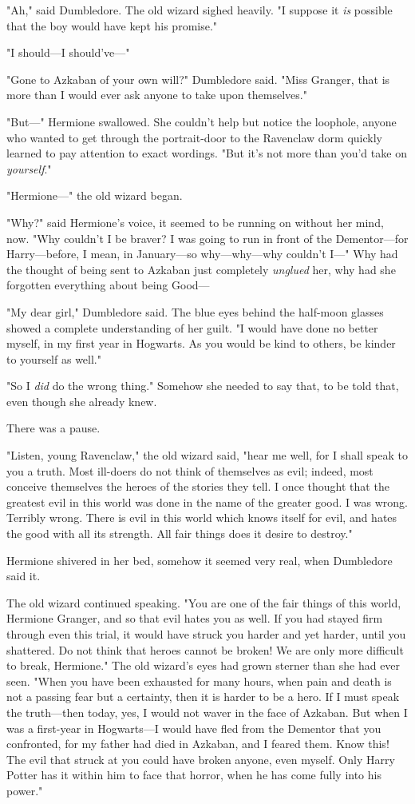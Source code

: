 "Ah," said Dumbledore. The old wizard sighed heavily. "I suppose it \emph{is}
possible that the boy would have kept his promise."

"I should---I should've---"

"Gone to Azkaban of your own will?" Dumbledore said. "Miss Granger, that is
more than I would ever ask anyone to take upon themselves."

"But---" Hermione swallowed. She couldn't help but notice the loophole, anyone
who wanted to get through the portrait-door to the Ravenclaw dorm quickly
learned to pay attention to exact wordings. "But it's not more than you'd take
on \emph{yourself}."

"Hermione---" the old wizard began.

"Why?" said Hermione's voice, it seemed to be running on without her mind, now.
"Why couldn't I be braver? I was going to run in front of the Dementor---for
Harry---before, I mean, in January---so why---why---why couldn't I---" Why had
the thought of being sent to Azkaban just completely \emph{unglued} her, why
had she forgotten everything about being Good---

"My dear girl," Dumbledore said. The blue eyes behind the half-moon glasses
showed a complete understanding of her guilt. "I would have done no better
myself, in my first year in Hogwarts. As you would be kind to others, be kinder
to yourself as well."

"So I \emph{did} do the wrong thing." Somehow she needed to say that, to be
told that, even though she already knew.

There was a pause.

"Listen, young Ravenclaw," the old wizard said, "hear me well, for I shall
speak to you a truth. Most ill-doers do not think of themselves as evil;
indeed, most conceive themselves the heroes of the stories they tell. I once
thought that the greatest evil in this world was done in the name of the
greater good. I was wrong. Terribly wrong. There is evil in this world which
knows itself for evil, and hates the good with all its strength. All fair
things does it desire to destroy."

Hermione shivered in her bed, somehow it seemed very real, when Dumbledore said
it.

The old wizard continued speaking. "You are one of the fair things of this
world, Hermione Granger, and so that evil hates you as well. If you had stayed
firm through even this trial, it would have struck you harder and yet harder,
until you shattered. Do not think that heroes cannot be broken! We are only
more difficult to break, Hermione." The old wizard's eyes had grown sterner
than she had ever seen. "When you have been exhausted for many hours, when pain
and death is not a passing fear but a certainty, then it is harder to be a
hero. If I must speak the truth---then today, yes, I would not waver in the
face of Azkaban. But when I was a first-year in Hogwarts---I would have fled
from the Dementor that you confronted, for my father had died in Azkaban, and I
feared them. Know this! The evil that struck at you could have broken anyone,
even myself. Only Harry Potter has it within him to face that horror, when he
has come fully into his power."

